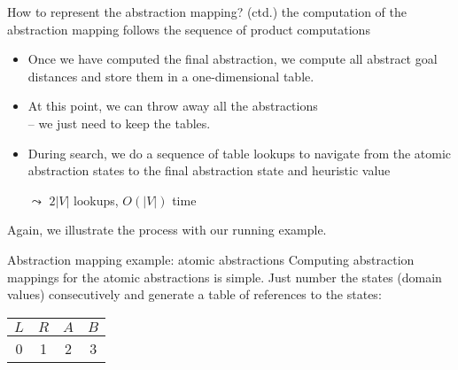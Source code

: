 \documentclass{gkibeamer}
\begin{document}
\begin{frame}{How to represent the abstraction mapping? (ctd.)}
   the computation of the abstraction mapping
  follows the sequence of product computations
  \begin{itemize}
  \item Once we have computed the final abstraction, we compute all
    \alert{abstract goal distances} and store them in a
    \alert{one-dimensional table}.
  \item At this point, we can \alert{throw away} all the abstractions
    \\
    -- we just need to keep the tables.
  \item During \alert{search}, we do a sequence of table lookups to
    navigate from the atomic abstraction states to the final
    abstraction state and heuristic value

    $\leadsto$ $2|V|$ lookups, $O(|V|)$ time
  \end{itemize}
  Again, we illustrate the process with our running example.
\end{frame}

\begin{frame}{Abstraction mapping example: atomic abstractions}
  Computing abstraction mappings for the atomic abstractions is
  simple. Just number the states (domain values) consecutively
  and generate a table of references to the states:

  \begin{center}
  \end{center}

  \begin{overprint}
    \begin{center}
      \begin{tabular}{cccc}
        $L$ & $R$ & $A$ & $B$ \\ \hline
        0   & 1   & 2   & 3
      \end{tabular}
    \end{center}
  \end{overprint}
\end{frame}
\end{document}
